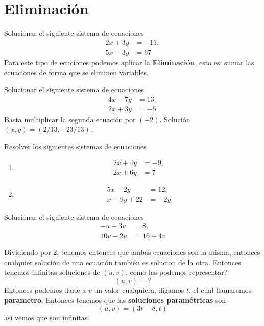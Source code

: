 
\section{Eliminación}\label{section:eliminacion}

\begin{ejemplo}
	Solucionar el siguiente sistema de ecuaciones
	\begin{align*}
	2x+3y &= -11, \\
	5x-3y &= 67
	\end{align*}
	Para este tipo de ecuciones podemos aplicar la \textbf{Eliminación}, esto es: sumar las ecuaciones de forma que se eliminen variables.
\end{ejemplo}

\begin{ejemplo}
	Solucionar el siguiente sistema de ecuaciones
	\begin{align*}
	4x-7y &= 13, \\
	2x+3y &= -5
	\end{align*}
	Basta multiplicar la segunda ecuación por $(-2)$. Solución $(x,y) = (2/13, -23/13)$.
\end{ejemplo}

\begin{exer}
	Resolver los siguientes sistemas de ecuaciones
	\begin{multicols}{2}
		\begin{enumerate}[label=\Alph*)]
			\item \begin{align*} 2x+4y&=-9, \\ 2x+6y &= 7\end{align*}
			\item \begin{align*} 5x-2y&=12, \\ x-9y+22 &= -2y\end{align*}
		\end{enumerate}
	\end{multicols}
\end{exer}

\begin{ejemplo}
	Solucionar el siguiente sistema de ecuaciones
	\begin{align*}
	-u+3v &= 8, \\
	10v - 2u &= 16+4v
	\end{align*}
	
	Dividiendo por 2, tenemos entonces que ambas ecuaciones son la misma, entonces cualquier solución de una ecuación también es solucion de la otra. Entonces tenemos infinitas soluciones de $(u,v)$, como las podemos representar?
	\[
	(u,v)=?
	\]
	Entonces podemos darle a $v$ un valor cualquiera, digamos $t$, el cual llamaremos \textbf{parametro}. Entonces tenemos que las \textbf{soluciones paramétricas} son
	\[
	(u,v) = (3t-8,t)
	\]
	así vemos que son infinitas.
\end{ejemplo}

